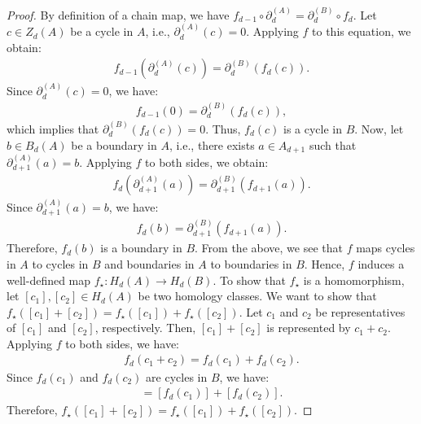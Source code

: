 \begin{proof}
	By definition of a chain map, we have \( f_{d-1} \circ \partial^{(A)}_d = \partial^{(B)}_d \circ f_d \). Let \(c \in Z_{d}(A)\) be a cycle in \( A \), i.e., \( \partial^{(A)}_{d}(c) = 0 \). Applying \( f \) to this equation, we obtain:
	\begin{align}
		f_{d-1}(\partial^{(A)}_{d}(c)) = \partial^{(B)}_{d}(f_{d}(c)). 
	\end{align}
	Since \( \partial^{(A)}_{d}(c) = 0 \), we have:
	\begin{align}
		f_{d-1}(0) = \partial^{(B)}_{d}(f_{d}(c)), 
	\end{align}
	which implies that \( \partial^{(B)}_{d}(f_{d}(c)) = 0 \). Thus, \( f_{d}(c) \) is a cycle in \( B \). Now, let \(b \in B_{d}(A) \) be a boundary in \( A \), i.e., there exists \( a \in A_{d+1} \) such that \( \partial^{(A)}_{d+1}(a) = b \). Applying \( f \) to both sides, we obtain:
	\begin{align}
		f_{d}(\partial^{(A)}_{d+1}(a)) = \partial^{(B)}_{d+1}(f_{d+1}(a)). 
	\end{align}
	Since \( \partial^{(A)}_{d+1}(a) = b \), we have:
	\begin{align}
		f_{d}(b) = \partial^{(B)}_{d+1}(f_{d+1}(a)). 
	\end{align}
	Therefore, \( f_{d}(b) \) is a boundary in \( B \). From the above, we see that \( f \) maps cycles in \( A \) to cycles in \( B \) and boundaries in \( A \) to boundaries in \( B \). Hence, \( f \) induces a well-defined map \( f_{\star}: H_{d}(A) \rightarrow H_{d}(B) \). To show that \( f_{\star} \) is a homomorphism, let \([c_{1}], [c_{2}] \in H_{d}(A) \) be two homology classes. We want to show that \( f_{\star}([c_{1}] + [c_{2}]) = f_{\star}([c_{1}]) + f_{\star}([c_{2}]) \). Let \( c_{1} \) and \( c_{2} \) be representatives of \([c_{1}]\) and \([c_{2}]\), respectively. Then, \([c_{1}] + [c_{2}]\) is represented by \( c_{1} + c_{2} \). Applying \( f \) to both sides, we have:
	\begin{align}
		f_{d}(c_{1} + c_{2}) = f_{d}(c_{1}) + f_{d}(c_{2}). 
	\end{align}
	Since \( f_{d}(c_{1}) \) and \( f_{d}(c_{2}) \) are cycles in \( B \), we have:
	\begin{align}
		[f_{d}(c_{1} + c_{2})] = [f_{d}(c_{1})] + [f_{d}(c_{2})]. 
	\end{align}
	Therefore, \( f_{\star}([c_{1}] + [c_{2}]) = f_{\star}([c_{1}]) + f_{\star}([c_{2}]) \).
\end{proof}

